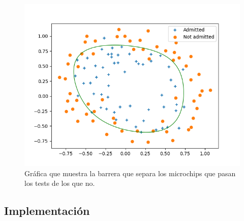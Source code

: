 \documentclass[11pt]{article}
\begin{document}
 \begin{figure}[h!]
    \begin{center}
    \includegraphics[width=\textwidth]{Imagenes/Circulico.png}
    \caption{Gráfica que muestra la barrera que separa los microchips que pasan los tests de los que no.}
    \label{fig:Resultados}
    \end{center}
 \end{figure}

\newpage
\subsection{Implementación}


\end{document}
